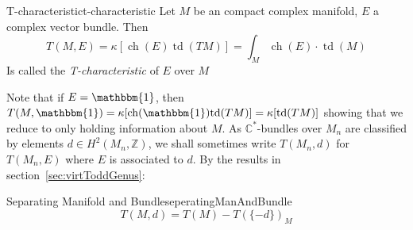 \documentclass{book}
\newcommand{\Z}{{\mathbb{Z}}}
\newcommand{\C}{{\mathbb{C}}}
\newcommand{\ch}{{\operatorname{ch}}}
\newcommand{\td}{{\operatorname{td}}}
\renewcommand{\ch}{{\operatorname{ch}}}
\begin{document}
\begin{defn}{T-characteristic}{t-characteristic}
  Let $M$ be an compact complex manifold, $E$ a complex vector bundle. Then
  \[
    T(M, E) = \kappa[\ch(E)\td(TM)] = \int_M \ch(E)\cdot \td(M)
  \]
  Is called the \emph{T-characteristic} of $E$ over $M$
\end{defn}
Note that if $E = \mathbbm{1}$, then $T(M,\mathbbm{1}) = \kappa[\ch(\mathbbm{1})\td(TM)] = \kappa[\td(TM)]$
showing that we reduce to only holding information about $M$.
As $\C^*$-bundles over $M_n$ are classified by elements $d \in H^2(M_n, \Z)$, we shall sometimes write $T(M_n,
d)$ for $T(M_n, E)$ where $E$ is associated to $d$. By the results in section~\ref{sec:virtToddGenus}:
\begin{prop}{Separating Manifold and Bundle}{seperatingManAndBundle}
  \[
  T(M, d) = T(M) - T(\{-d\})_M
\]
\end{prop}
\end{document}
